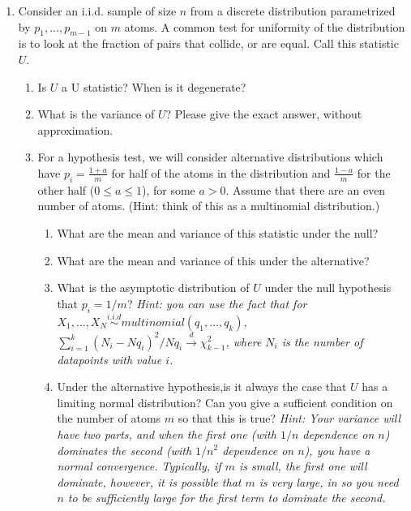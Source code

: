 \documentclass[11pt]{article}
\begin{document}
\begin{enumerate}
\item Consider an i.i.d. sample of size $n$ from a discrete distribution parametrized by $p_1,\dots, p_{m-1}$  on $m$ atoms. A common test for uniformity of the distribution is to look at the fraction of pairs that collide, or are equal. Call this statistic $U$.
\begin{enumerate}
	\item Is $U$ a U statistic? When is it degenerate?
	\item What is the variance of $U$? Please give the exact answer, without approximation. 
	\item For a hypothesis test, we will consider alternative distributions which have $p_i=\frac{1+a}{m}$ for half of the atoms in the distribution and $\frac{1-a}{m}$ for the other half ($0\le a\le 1$), for some $a>0$. Assume that there are an even number of atoms. (Hint: think of this as a multinomial distribution.)%
	\begin{enumerate}
		\item What are the mean and variance of this statistic under the null?
		\item What are the mean and variance of this under the alternative?
		\item What is the asymptotic distribution of $U$ under the null hypothesis that $p_i=1/m$? \textit{Hint: you can use the fact that for $X_1,\dots, X_N\stackrel{i.i.d}{\sim} multinomial(q_1,\dots,q_k)$, $\sum_{i=1}^k (N_i-Nq_i)^2/Nq_i\stackrel{d}{\rightarrow} \chi^2_{k-1}$, where $N_i$ is the number of datapoints with value $i$.}
		\item Under the alternative hypothesis,is it always the case that $U$ has a limiting normal distribution? Can you give a sufficient condition on the number of atoms $m$  so that this is true?  
		\textit{Hint: Your variance will have two parts, and when the first one (with $1/n$ dependence on $n$) dominates the second (with $1/n^2$ dependence on $n$), you have a normal convergence. Typically, if $m$ is small, the first one will dominate, however, it is possible that $m$ is very large, in so you need $n$ to be sufficiently large for the first term to dominate the second. }

\end{enumerate}
\end{enumerate}
\end{enumerate}
\end{document}
